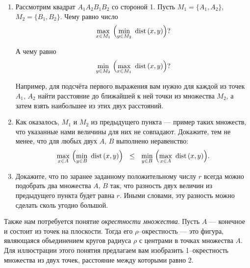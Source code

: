 \vspace{-0.2cm}
\begin{enumerate}

\item Рассмотрим квадрат $A_1A_2B_1B_2$ со стороной 1. Пусть $M_1 = \{A_1, A_2\}$, $M_2 = \{B_1, B_2\}$. Чему равно число
\vspace{-0.2cm}
$$\max\l{x \in M_1}\ \Bigl(\min\l{y \in M_2}\ \dist (x,y)\Bigr)?$$

\vspace{-0.2cm}
А чему равно
\vspace{-0.2cm}
$$\min\l{y \in M_2}\ \Bigl(\max\l{x \in M_1}\ \dist (x,y)\Bigr)?$$

\vspace{-0.2cm}
Например, для подсчёта первого выражения вам нужно для каждой из точек $A_1$, $A_2$ найти расстояние до ближайшей к ней точки из множества $M_2$, а затем взять наибольшее из этих двух расстояний.

\item Как оказалось, $M_1$ и $M_2$ из предыдущего пункта — пример таких множеств, что указанные нами величины для них не совпадают. Докажите, тем не менее, что для любых двух $A$, $B$ выполнено неравенство:
\vspace{-0.2cm}
$$\max\l{x \in A}\ \Bigl(\min\l{y \in B}\ \dist (x,y)\Bigr)\ \ \le\ \ 
	\min\l{y \in B}\ \Bigl(\max\l{x \in A}\ \dist (x,y)\Bigr).$$

\vspace{-0.45cm}
\item Докажите, что по заранее заданному положительному числу $r$ всегда можно подобрать два множества $A$, $B$ так, что разность двух величин из предыдущего пункта будет равна $r$. Иными словами, эту разность можно сделать сколь угодно большой.

\end{enumerate}

\noindent Также нам потребуется понятие {\it окрестности множества}. Пусть $A$ — конечное и состоит из точек на плоскости. Тогда его $\rho$--окрестность — это фигура, являющаяся объединением кругов радиуса $\rho$ с центрами в точках множества $A$. Для иллюстрации этого понятия предлагаем вам изобразить 1--окрестность множества из двух точек, расстояние между которыми равно 2.

